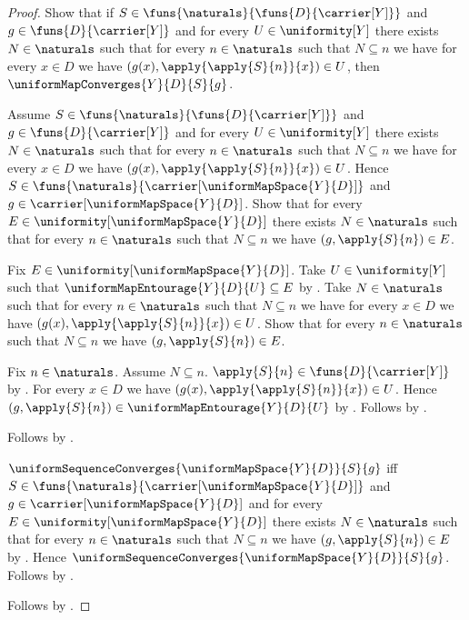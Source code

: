 \begin{proof}
    Show that if $S\in\funs{\naturals}{\funs{D}{\carrier[Y]}}$ and
        $g\in\funs{D}{\carrier[Y]}$ and for every $U\in\uniformity[Y]$
        there exists $N\in\naturals$ such that for every $n\in\naturals$
        such that $N\subseteq n$ we have for every $x\in D$ we have
            $(g(x),\apply{\apply{S}{n}}{x})\in U$, then
        $\uniformMapConverges{Y}{D}{S}{g}$.
    \begin{subproof}
        Assume $S\in\funs{\naturals}{\funs{D}{\carrier[Y]}}$ and
            $g\in\funs{D}{\carrier[Y]}$ and for every
            $U\in\uniformity[Y]$ there exists $N\in\naturals$ such that for
            every $n\in\naturals$ such that $N\subseteq n$ we have for
            every $x\in D$ we have
            $(g(x),\apply{\apply{S}{n}}{x})\in U$.
        Hence $S\in\funs{\naturals}
            {\carrier[\uniformMapSpace{Y}{D}]}$ and
            $g\in\carrier[\uniformMapSpace{Y}{D}]$.
        Show that for every $E\in\uniformity[\uniformMapSpace{Y}{D}]$
            there exists $N\in\naturals$ such that for every
            $n\in\naturals$ such that $N\subseteq n$ we have
            $(g,\apply{S}{n})\in E$.
        \begin{subproof}
            Fix $E\in\uniformity[\uniformMapSpace{Y}{D}]$.
            Take $U\in\uniformity[Y]$ such that
                $\uniformMapEntourage{Y}{D}{U}\subseteq E$ by
                .
            Take $N\in\naturals$ such that for every $n\in\naturals$ such
                that $N\subseteq n$ we have for every $x\in D$ we have
                $(g(x),\apply{\apply{S}{n}}{x})\in U$.
            Show that for every $n\in\naturals$ such that $N\subseteq n$
                we have $(g,\apply{S}{n})\in E$.
            \begin{subproof}
                Fix $n\in\naturals$.
                Assume $N\subseteq n$.
                $\apply{S}{n}\in\funs{D}{\carrier[Y]}$ by
                    .
                For every $x\in D$ we have
                    $(g(x),\apply{\apply{S}{n}}{x})\in U$.
                Hence $(g,\apply{S}{n})\in
                    \uniformMapEntourage{Y}{D}{U}$ by
                    .
                Follows by .
            \end{subproof}
            Follows by \auto.
        \end{subproof}
        $\uniformSequenceConverges{\uniformMapSpace{Y}{D}}{S}{g}$ iff
            $S\in\funs{\naturals}
                {\carrier[\uniformMapSpace{Y}{D}]}$ and
            $g\in\carrier[\uniformMapSpace{Y}{D}]$ and for every
            $E\in\uniformity[\uniformMapSpace{Y}{D}]$ there exists
            $N\in\naturals$ such that for every $n\in\naturals$ such that
            $N\subseteq n$ we have $(g,\apply{S}{n})\in E$ by
            .
        Hence $\uniformSequenceConverges{\uniformMapSpace{Y}{D}}{S}{g}$.
        Follows by .
    \end{subproof}
    Follows by \auto.
\end{proof}

